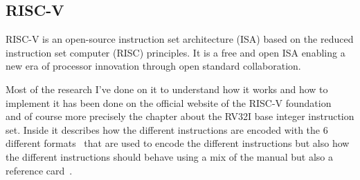 \subsection{RISC-V}
RISC-V is an open-source instruction set architecture (ISA) based on the reduced instruction set
computer (RISC) principles. It is a free and open ISA enabling a new era of processor innovation
through open standard collaboration.

Most of the research I've done on it to understand how it works and how to implement it has been
done on the official website of the RISC-V foundation~\cite[p.~9-25]{riscv_manual} and of course more precisely
the chapter about the RV32I base integer instruction set. Inside it describes how the different instructions
are encoded with the 6 different formats~\cite[p.~104-105]{riscv_manual} that are used to encode the different instructions but also 
how the different instructions should behave using a mix of the manual but also a reference card~\cite[p.~81-83]{refcard}.